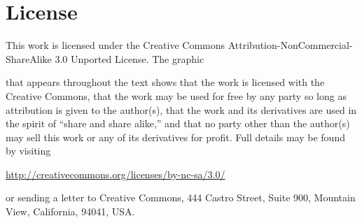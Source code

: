
\section*{License}
This work is licensed under the Creative Commons Attribution-NonCommercial-ShareAlike
3.0 Unported License. The graphic
\begin{center}
\end{center}
that appears throughout the text shows that the work is licensed with the Creative Commons, that
the work may be used for free by any party so long as attribution is given to the author(s), that the
work and its derivatives are used in the spirit of ``share and share alike,'' and that no party other than the author(s) may
sell this work or any of its derivatives for profit. Full details may be found by visiting

\begin{center}
\url{http://creativecommons.org/licenses/by-nc-sa/3.0/}
\end{center}
or sending a letter to Creative Commons, 444 Castro Street, Suite 900, Mountain View, California,
94041, USA.


\endinput
